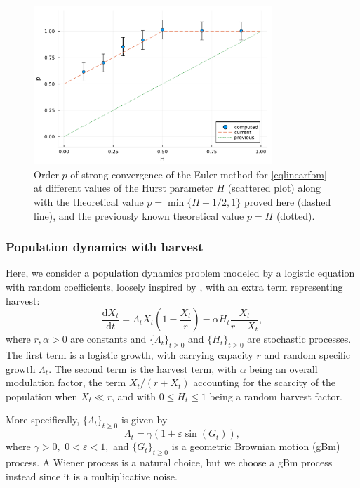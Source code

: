 \documentclass[reqno,12pt]{amsart}
\theoremstyle{plain} %
\theoremstyle{definition} %
\begin{document}
\begin{figure}[htb]
    \centerline{\includegraphics[width=0.8\textwidth]{img/order_dep_on_H_fBm.pdf}}
    \caption{Order $p$ of strong convergence of the Euler method for \cref{eqlinearfbm} at different values of the Hurst parameter $H$ (scattered plot) along with the theoretical value $p=\min\{H + 1/2, 1\}$ proved here (dashed line), and the previously known theoretical value $p=H$ (dotted).}
    \label{figorderdepHfBm}
\end{figure}

\subsubsection{Population dynamics with harvest}
\label{secpopdyn}

Here, we consider a population dynamics problem modeled by a logistic equation with random coefficients, loosely inspired by \cite[Section 15.2]{HanKloeden2017}, with an extra term representing harvest:
\begin{equation}
    \label{rodepopulationdynamics}
    \frac{\mathrm{d}X_t}{\mathrm{d}t} = \Lambda_t X_t (1 - \frac{X_t}{r}) - \alpha H_t \frac{X_t}{r + X_t},
\end{equation}
where $r, \alpha > 0$ are constants and $\{\Lambda_t\}_{t \geq 0}$ and $\{H_t\}_{t \geq 0}$ are stochastic processes. The first term is a logistic growth, with carrying capacity $r$ and random specific growth $\Lambda_t$. The second term is the harvest term, with $\alpha$ being an overall modulation factor, the term $X_t / (r + X_t)$ accounting for the scarcity of the population when $X_t \ll r$, and with $0 \leq H_t \leq 1$ being a random harvest factor. 

More specifically, $\{\Lambda_t\}_{t \geq 0}$ is given by
\[
    \Lambda_t = \gamma (1 + \varepsilon \sin(G_t)),
\]
where $\gamma > 0,$ $0 < \varepsilon < 1,$ and $\{G_t\}_{t\geq 0}$ is a geometric Brownian motion (gBm) process. A Wiener process is a natural choice, but we choose a gBm process instead since it is a multiplicative noise.
\end{document}
